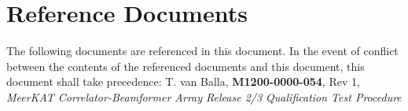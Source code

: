 \section{Reference Documents}
The following documents are referenced in this document. In the event of conflict between the contents of the referenced documents and this document, this document shall take precedence:\newline
[2]\hspace{10mm} T. van Balla, {\bf M1200-0000-054}, Rev 1, {\it MeerKAT Correlator-Beamformer Array Release 2/3 Qualification Test Procedure}\newline

